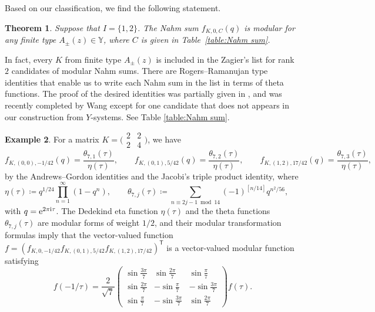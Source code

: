 \documentclass[pdftex]{sigma}
\numberwithin{equation}{section}
\newtheorem{Theorem}{Theorem}[section]
\theoremstyle{definition}
\newtheorem{Example}[Theorem]{Example}
\begin{document}
Based on our classification, we find the following statement.
\begin{Theorem}
 Suppose that $I= \{1, 2\}$.
 The Nahm sum $f_{K, 0, C} (q)$ is modular for any finite type $A_\pm (z) \in \mathbb{Y}$,
 where $C$ is given in Table~{\rm\ref{table:Nahm sum}}.
\end{Theorem}
In fact, every $K$ from finite type $A_\pm(z)$ is included in the Zagier's list \cite[Table 2]{Zagier}
for rank~$2$ candidates of modular Nahm sums.
There are Rogers--Ramanujan type identities that enable us to write each Nahm sum in the list in terms of theta functions.
The proof of the desired identities was partially given in \cite{Andrews74,CalinescuMilasPenn16,CherednikFeigin, VlasenkoZwegers,Zagier},
and was recently completed by Wang \cite{wang2022rank2} except for one candidate that does not appears in our construction from $Y$-systems.
See Table \ref{table:Nahm sum}.

\begin{Example}
 For a matrix $K =
 \bigl(\begin{smallmatrix}
 2 & 2 \\
 2 & 4
 \end{smallmatrix}\bigr)$,
 we have
 \begin{equation*}
 f_{K, (0, 0), -1/42} (q) = \frac{\theta_{7, 1}(\tau)}{\eta(\tau)}, \qquad
 f_{K, (0, 1), 5/42} (q) = \frac{\theta_{7, 2}(\tau)}{\eta(\tau)}, \qquad
 f_{K, (1, 2), 17/42} (q) = \frac{\theta_{7, 3}(\tau)}{\eta(\tau)},
 \end{equation*}
 by the Andrews--Gordon identities \cite{Andrews74}
 and the Jacobi's triple product identity,
 where
 \begin{equation*}
 \eta (\tau) \coloneqq q^{1/24} \prod_{n=1}^\infty (1 - q^n), \qquad
 \theta_{7,j} (\tau) \coloneqq \sum_{n \equiv 2 j -1 \bmod{14}} (-1)^{[n/14]}
 q^{n^2 / 56}, \qquad
 \end{equation*}
 with $q = {\rm e}^{2 \pi {\rm i} \tau}$.
 The Dedekind eta function $\eta(\tau)$ and the theta functions $\theta_{7,j} (\tau)$
 are modular forms of weight $1/2$,
 and their modular transformation formulas imply that the vector-valued function
 $f = (f_{K,0, -1/42} f_{K, (0,1), 5/42} f_{K, (1,2), 17/42})^{\mathsf{T}}$
 is a vector-valued modular function satisfying
 \begin{equation*}
 f(-1/\tau) =
 \frac{2}{\sqrt{7}}
 \begin{pmatrix}
 \sin \frac{3 \pi}{7} & \sin \frac{2 \pi}{7} & \sin \frac{\pi}{7} \\
 \sin \frac{2 \pi}{7} & -\sin \frac{\pi}{7} & -\sin \frac{3 \pi}{7} \\
 \sin \frac{\pi}{7} & -\sin \frac{3 \pi}{7} & \sin \frac{2 \pi}{7}
 \end{pmatrix}
 f(\tau).
 \end{equation*}
\end{Example}
\end{document}

